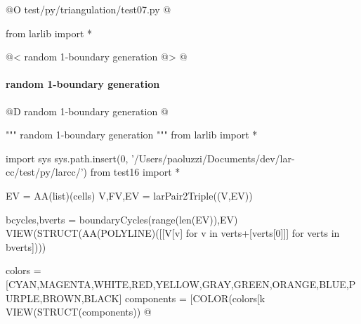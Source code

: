 \documentclass[11pt,oneside]{article}	%
\begin{document}
@O test/py/triangulation/test07.py
@{
from larlib import *

@< random 1-boundary generation @>
@}

\paragraph{random 1-boundary generation}

@D random 1-boundary generation
@{""" random 1-boundary generation """
from larlib import *

import sys
sys.path.insert(0, '/Users/paoluzzi/Documents/dev/lar-cc/test/py/larcc/')
from test16 import *

EV = AA(list)(cells)
V,FV,EV = larPair2Triple((V,EV))

bcycles,bverts = boundaryCycles(range(len(EV)),EV)
VIEW(STRUCT(AA(POLYLINE)([[V[v] for v in verts+[verts[0]]] for verts in bverts])))

colors = [CYAN,MAGENTA,WHITE,RED,YELLOW,GRAY,GREEN,ORANGE,BLUE,PURPLE,BROWN,BLACK]
components = [COLOR(colors[k%
VIEW(STRUCT(components))
@}








\end{document}
